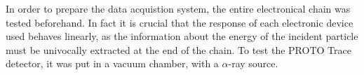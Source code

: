 In order to prepare the data acquistion system, the entire electronical chain
was tested beforehand. In fact it is crucial that the response of each
electronic device used behaves linearly, as the information about the energy
of the incident particle must be univocally extracted at the end of the chain.
To test the PROTO Trace detector, it was put in a vacuum chamber, with a
$\alpha$-ray source.